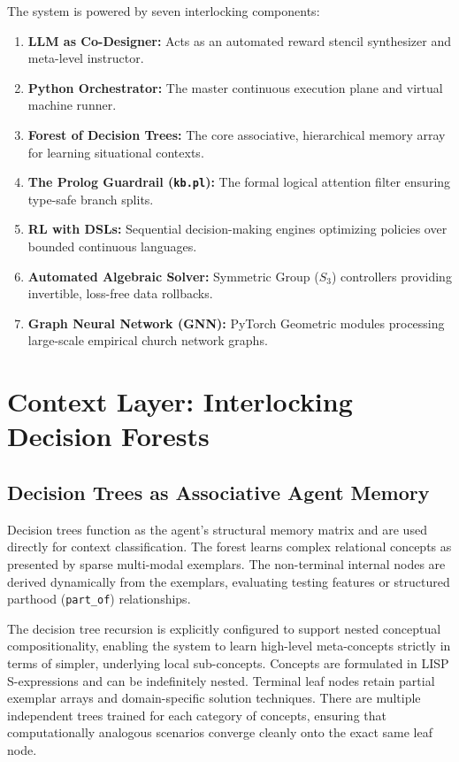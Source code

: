 \documentclass[11pt,fleqn]{article}
\begin{document}
The system is powered by seven interlocking components:
\begin{enumerate}
    \item \textbf{LLM as Co-Designer:} Acts as an automated reward stencil synthesizer and meta-level instructor.
    \item \textbf{Python Orchestrator:} The master continuous execution plane and virtual machine runner.
    \item \textbf{Forest of Decision Trees:} The core associative, hierarchical memory array for learning situational contexts.
    \item \textbf{The Prolog Guardrail (\texttt{kb.pl}):} The formal logical attention filter ensuring type-safe branch splits.
    \item \textbf{RL with DSLs:} Sequential decision-making engines optimizing policies over bounded continuous languages.
    \item \textbf{Automated Algebraic Solver:} Symmetric Group ($S_3$) controllers providing invertible, loss-free data rollbacks.
    \item \textbf{Graph Neural Network (GNN):} PyTorch Geometric modules processing large-scale empirical church network graphs.
\end{enumerate}

\section{Context Layer: Interlocking Decision Forests}

\subsection{Decision Trees as Associative Agent Memory}
Decision trees function as the agent's structural memory matrix and are used directly for context classification. The forest learns complex relational concepts as presented by sparse multi-modal exemplars. The non-terminal internal nodes are derived dynamically from the exemplars, evaluating testing features or structured parthood (\texttt{part\_of}) relationships. 

The decision tree recursion is explicitly configured to support nested conceptual compositionality, enabling the system to learn high-level meta-concepts strictly in terms of simpler, underlying local sub-concepts. Concepts are formulated in LISP S-expressions and can be indefinitely nested. Terminal leaf nodes retain partial exemplar arrays and domain-specific solution techniques. There are multiple independent trees trained for each category of concepts, ensuring that computationally analogous scenarios converge cleanly onto the exact same leaf node.
\end{document}
